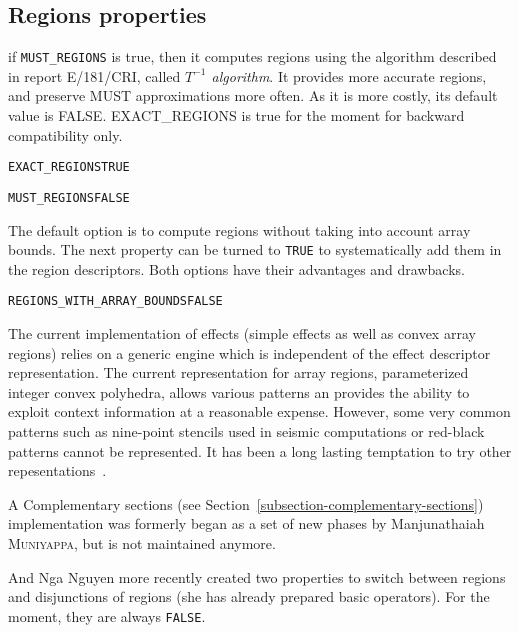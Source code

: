 \documentclass[a4paper]{report}
\newenvironment{PipsProp}{\begin{alltt}}{\end{alltt}}
\begin{document}
\subsection{Regions properties}
\label{subsection-regions}

if {\tt MUST\_REGIONS} is true, then it computes regions using the
algorithm described in report E/181/CRI, called {\em $T^{-1}$
algorithm}. It provides more accurate regions, and preserve MUST
approximations more often. As it is more costly, its default value
is FALSE. EXACT\_REGIONS is true for the moment for backward
compatibility only.

\begin{PipsProp}
EXACT_REGIONS TRUE
\end{PipsProp}

\begin{PipsProp}
MUST_REGIONS FALSE
\end{PipsProp}

The default option is to compute regions without taking into account array
bounds. The next property can be turned to {\tt TRUE} to
systematically add them in
the region descriptors. Both options have their advantages and drawbacks. 

\begin{PipsProp}
REGIONS_WITH_ARRAY_BOUNDS FALSE
\end{PipsProp}


The current implementation of effects (simple effects as well as
convex array regions) relies on a generic engine which is independent
of the effect descriptor representation. The current representation
for array regions, parameterized integer convex polyhedra, allows
various patterns an provides the ability to exploit context
information at a reasonable expense. However, some very common
patterns such as nine-point stencils used in seismic computations or
red-black patterns cannot be represented. It has been a long lasting
temptation to try other repesentations~\cite{C96}. 

A Complementary sections (see Section~\ref{subsection-complementary-sections})
implementation was formerly began as a set of new phases by
Manjunathaiah \textsc{Muniyappa}, but is not maintained anymore. 

And Nga Nguyen more recently created two properties to switch between
regions and disjunctions of regions (she has already prepared basic
operators). For the moment, they are always {\tt FALSE}.
\end{document}
